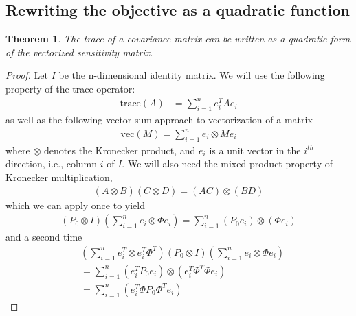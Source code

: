 \documentclass[10pt,a4paper]{article}
\newtheorem{theorem}{Theorem}
\begin{document}
	\subsection{Rewriting the objective as a quadratic function}
	\begin{theorem}
		The trace of a covariance matrix can be written as a quadratic form of the vectorized sensitivity matrix.
	\end{theorem}
\begin{proof}
	Let $I$ be the n-dimensional identity matrix. We will use the following property of the trace operator:
	\begin{align}
	\mathrm{trace}(A) &=  \sum_{i=1}^{n} e_i^T Ae_i
	\end{align}
	as well as the following vector sum approach to vectorization of a matrix
	\begin{align}
	\mathrm{vec}(M) = \sum_{i=1}^{n} e_i \otimes Me_i
	\end{align}
	where $\otimes$ denotes the Kronecker product, and $e_i$ is a unit vector in the $i^{th}$ direction, i.e., column $i$ of $I$. 
We will also need the mixed-product property of Kronecker multiplication,
\begin{align}
(A\otimes B)(C\otimes D) = (AC)\otimes(BD)
\end{align}
which we can apply once to yield 
\begin{align}
(P_0\otimes I)(\sum_{i=1}^{n} e_i \otimes \Phi e_i) = \sum_{i=1}^{n} (P_0 e_i)\otimes(\Phi e_i)
\end{align}
and a second time
\begin{align}
&(\sum_{i=1}^{n} e_i^T \otimes e_i^T\Phi^T)(P_0\otimes I)(\sum_{i=1}^{n} e_i \otimes \Phi e_i) \\
&= \sum_{i=1}^{n} (e_i^TP_0 e_i)\otimes(e_i^T\Phi^T\Phi e_i) \\
&= \sum_{i=1}^{n} (e_i^T\Phi P_0\Phi^T e_i) %
\end{align}


\end{proof}
\end{document}
